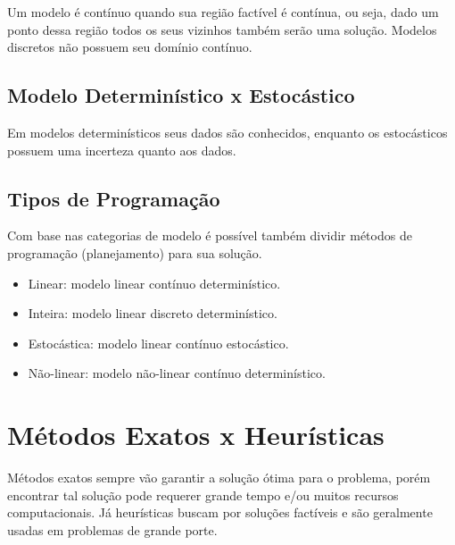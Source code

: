 Um modelo é contínuo quando sua região factível é contínua, ou seja, dado um ponto dessa região todos os seus vizinhos também serão uma solução.
Modelos discretos não possuem seu domínio contínuo.

\subsection{Modelo Determinístico x Estocástico}\label{subsec:modelo-deterministico-x-estocastico}

Em modelos determinísticos seus dados são conhecidos, enquanto os estocásticos possuem uma incerteza quanto aos dados.

\subsection{Tipos de Programação}\label{subsec:tipos-de-programacao}

Com base nas categorias de modelo é possível também dividir métodos de programação (planejamento) para sua solução.

\begin{itemize}
    \item Linear: modelo linear contínuo determinístico.
    \item Inteira: modelo linear discreto determinístico.
    \item Estocástica: modelo linear contínuo estocástico.
    \item Não-linear: modelo não-linear contínuo determinístico.
\end{itemize}


\section{Métodos Exatos x Heurísticas}\label{sec:metodos-exatos-x-heuristicas}

Métodos exatos sempre vão garantir a solução ótima para o problema, porém encontrar tal solução pode requerer grande tempo e/ou muitos recursos computacionais.
Já heurísticas buscam por soluções factíveis e são geralmente usadas em problemas de grande porte.
